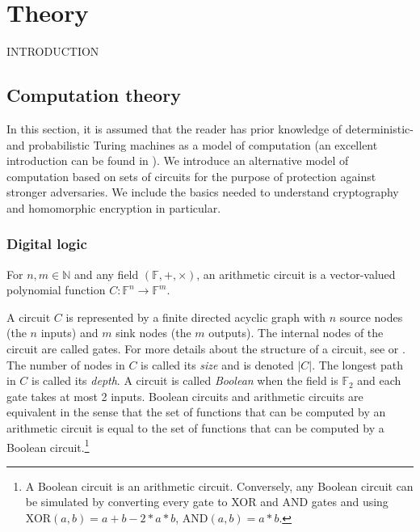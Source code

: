 \chapter{Theory}

INTRODUCTION


\section{Computation theory}
 In this section, it is assumed that the reader has prior knowledge of deterministic- and probabilistic Turing machines as a model of computation (an excellent introduction can be found in \cite{Gol01}). We introduce an alternative model of computation based on sets of circuits for the purpose of protection against stronger adversaries. We include the basics needed to understand cryptography and homomorphic encryption in particular. 

 \subsection*{Digital logic}

\begin{definition}[Circuit]
For $n, m \in \mathbb{N}$ and any field $(\mathbb{F},+,\times)$, an arithmetic circuit is a vector-valued polynomial function $C \colon \mathbb{F}^{n} \to \mathbb{F}^m$. 
\end{definition}

A circuit $C$ is represented by a finite directed acyclic graph with $n$ source nodes (the $n$ inputs) and $m$ sink nodes (the $m$ outputs). The internal nodes of the circuit are called gates. For more details about the structure of a circuit, see \cite{goldreich_2008} or \cite{MF21}. The number of nodes in $C$ is called its \emph{size} and is denoted $|C|$. The longest path in $C$ is called its \emph{depth}.
A circuit is called \emph{Boolean} when the field is $\mathbb{F}_2$ and each gate takes at most 2 inputs. Boolean circuits and arithmetic circuits are equivalent in the sense that the set of functions that can be computed by an arithmetic circuit is equal to the set of functions that can be computed by a Boolean circuit.\footnote{A Boolean circuit is an arithmetic circuit. Conversely, any Boolean circuit can be simulated by converting every gate to XOR and AND gates and using XOR$(a,b) = a+b-2*a*b$, AND$(a,b) = a*b$.} 

